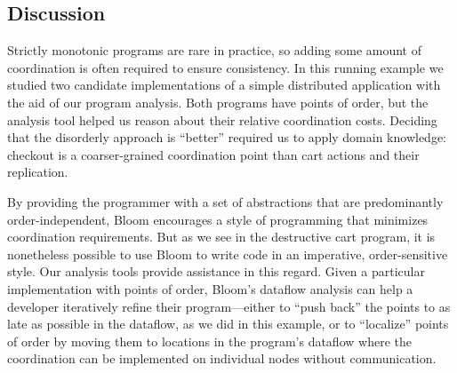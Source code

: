 \subsection{Discussion}
Strictly monotonic programs are rare in practice, so adding some amount of
coordination is often required to ensure consistency. In this running example we
studied two candidate implementations of a simple distributed application with
the aid of our program analysis. Both programs have points of order, but the
analysis tool helped us reason about their relative coordination costs.
Deciding that the disorderly approach is ``better'' required us to apply domain
knowledge: checkout is a coarser-grained coordination point than cart actions
and their replication.

By providing the programmer with a set of abstractions that are predominantly
order-independent, Bloom encourages a style of programming that minimizes
coordination requirements. But as we see in the destructive cart program, it is
nonetheless possible to use Bloom to write code in an imperative,
order-sensitive style. Our analysis tools provide assistance in this regard.
Given a particular implementation with points of order, Bloom's dataflow
analysis can help a developer iteratively refine their program---either to
``push back'' the points to as late as possible in the dataflow, as we did in
this example, or to ``localize'' points of order by moving them to locations in
the program's dataflow where the coordination can be implemented on individual
nodes without communication.
